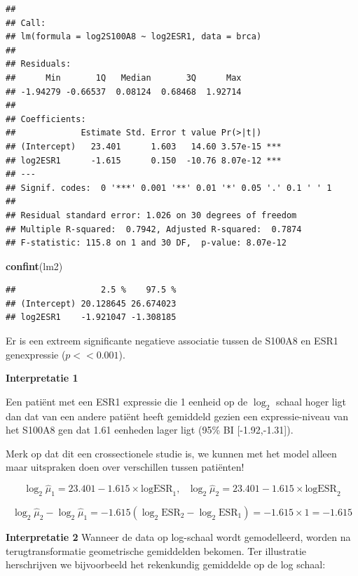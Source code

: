 \documentclass[
  12pt,dutch]{book}
\newenvironment{Shaded}{\begin{snugshade}}{\end{snugshade}}
\newcommand{\FunctionTok}[1]{\textcolor[rgb]{0.13,0.29,0.53}{\textbf{#1}}}
\newcommand{\NormalTok}[1]{#1}
\theoremstyle{definition}
\theoremstyle{definition}
\theoremstyle{definition}
\theoremstyle{definition}
\theoremstyle{remark}
\begin{document}
\begin{verbatim}
## 
## Call:
## lm(formula = log2S100A8 ~ log2ESR1, data = brca)
## 
## Residuals:
##      Min       1Q   Median       3Q      Max 
## -1.94279 -0.66537  0.08124  0.68468  1.92714 
## 
## Coefficients:
##             Estimate Std. Error t value Pr(>|t|)    
## (Intercept)   23.401      1.603   14.60 3.57e-15 ***
## log2ESR1      -1.615      0.150  -10.76 8.07e-12 ***
## ---
## Signif. codes:  0 '***' 0.001 '**' 0.01 '*' 0.05 '.' 0.1 ' ' 1
## 
## Residual standard error: 1.026 on 30 degrees of freedom
## Multiple R-squared:  0.7942, Adjusted R-squared:  0.7874 
## F-statistic: 115.8 on 1 and 30 DF,  p-value: 8.07e-12
\end{verbatim}

\begin{Shaded}
\begin{Highlighting}[]
\FunctionTok{confint}\NormalTok{(lm2)}
\end{Highlighting}
\end{Shaded}

\begin{verbatim}
##                 2.5 %    97.5 %
## (Intercept) 20.128645 26.674023
## log2ESR1    -1.921047 -1.308185
\end{verbatim}

Er is een extreem significante negatieve associatie tussen de S100A8 en ESR1 genexpressie (\(p<<0.001\)).

\textbf{Interpretatie 1}

Een patiënt met een ESR1 expressie die 1 eenheid op de \(\log_2\) schaal hoger ligt dan dat van een andere patiënt heeft gemiddeld gezien een expressie-niveau van het S100A8 gen dat 1.61 eenheden lager ligt (95\% BI {[}-1.92,-1.31{]}).

Merk op dat dit een crossectionele studie is, we kunnen met het model alleen maar uitspraken doen over verschillen tussen patiënten!

\[\log_2 \hat\mu_1=23.401  -1.615 \times \text{logESR}_1,\text{ } \log_2 \hat\mu_2=23.401  -1.615 \times \text{logESR}_2 \]

\[\log_2 \hat\mu_2-\log_2 \hat\mu_1=  -1.615 (\log_2 \text{ESR}_2-\log_2 \text{ESR}_1) = -1.615 \times 1 = -1.615\]

\textbf{Interpretatie 2}
Wanneer de data op log-schaal wordt gemodelleerd, worden na terugtransformatie geometrische gemiddelden bekomen.
Ter illustratie herschrijven we bijvoorbeeld het rekenkundig gemiddelde op de log schaal:
\end{document}
